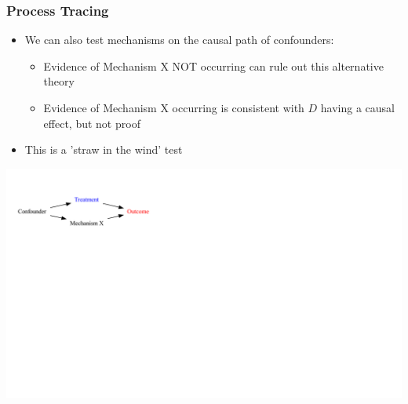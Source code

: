\documentclass[xcolor=x11names,compress]{beamer}\usepackage[]{graphicx}\usepackage[]{color}
\newenvironment{knitrout}{}{} %
\renewcommand{\(}{\begin{columns}}
\renewcommand{\)}{\end{columns}}
\newcommand{\<}[1]{\begin{column}{#1}}
\renewcommand{\>}{\end{column}}
\begin{document}
\begin{frame}
\frametitle{Process Tracing}
\begin{itemize}
\item We can also test mechanisms on the causal path of confounders:
\begin{itemize}
\item Evidence of Mechanism X NOT occurring can rule out this alternative theory
\item Evidence of Mechanism X occurring is consistent with $D$ having a causal effect, but not proof
\end{itemize}
\item This is a 'straw in the wind' test
\end{itemize}
\begin{knitrout}
\color{fgcolor}
\includegraphics[width=1.8\linewidth]{figure/Dag4-1} 

\end{knitrout}
\end{frame}
\end{document}
